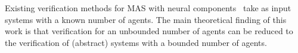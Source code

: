 Existing verification methods for MAS with neural
components~\cite{Akintunde+20b,Akintunde+22} take as input
systems with a known number of agents. The main theoretical
finding of this work is that verification for an unbounded
number of agents can be reduced to the verification  of
(abstract) systems with a bounded number of agents.








